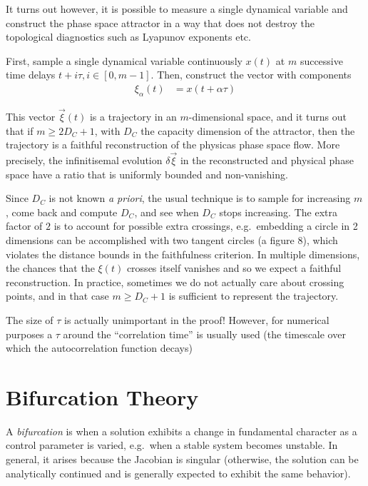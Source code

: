 \documentclass[12pt]{article}
\begin{document}
It turns out however, it is possible to measure a single dynamical variable and
construct the phase space attractor in a way that does not destroy the
topological diagnostics such as Lyapunov exponents etc.

First, sample a single dynamical variable continuously $x(t)$ at $m$ successive
time delays $t + i\tau, i \in [0,m-1]$. Then, construct the vector with
components
\begin{align}
    \xi_\alpha(t) &= x(t + \alpha\tau)
\end{align}

This vector $\vec{\xi}(t)$ is a trajectory in an $m$-dimensional space, and it
turns out that if $m \geq 2D_C + 1$, with $D_C$ the capacity dimension of the
attractor, then the trajectory is a faithful reconstruction of the physicas
phase space flow. More precisely, the infinitisemal evolution $\delta\vec{\xi}$
in the reconstructed and physical phase space have a ratio that is uniformly
bounded and non-vanishing.

Since $D_C$ is not known \emph{a priori}, the usual technique is to sample for
increasing $m$, come back and compute $D_C$, and see when $D_C$ stops
increasing. The extra factor of $2$ is to account for possible extra crossings,
e.g.\ embedding a circle in 2 dimensions can be accomplished with two tangent
circles (a figure $8$), which violates the distance bounds in the faithfulness
criterion. In multiple dimensions, the chances that the $\xi(t)$ crosses itself
vanishes and so we expect a faithful reconstruction. In practice, sometimes we
do not actually care about crossing points, and in that case $m \geq D_C + 1$ is
sufficient to represent the trajectory.

The size of $\tau$ is actually unimportant in the proof! However, for numerical
purposes a $\tau$ around the ``correlation time'' is usually used (the timescale
over which the autocorrelation function decays)

\clearpage

\section{Bifurcation Theory}

A \emph{bifurcation} is when a solution exhibits a change in fundamental
character as a control parameter is varied, e.g.\ when a stable system becomes
unstable. In general, it arises because the Jacobian is singular (otherwise, the
solution can be analytically continued and is generally expected to exhibit the
same behavior).
\end{document}
